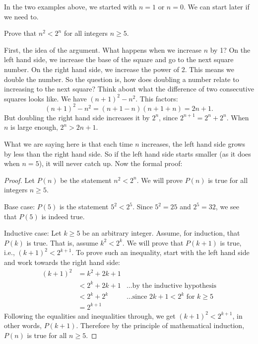 \documentclass[12pt]{article}
\begin{document}
In the two examples above, we started with $n = 1$ or $n = 0$.  We can start later if we need to.

\begin{example}
  Prove that $n^2 < 2^n$ for all integers $n \ge 5$.
  \begin{solution}
  	First, the idea of the argument.  What happens when we increase $n$ by 1?  On the left hand side, we increase the base of the square and go to the next square number.  On the right hand side, we increase the power of 2.  This means we double the number.  So the question is, how does doubling a number relate to increasing to the next square?  Think about what the difference of two consecutive squares looks like.  We have $(n+1)^2 - n^2$.  This factors: \[(n+1)^2 - n^2 = (n+1-n)(n+1+n) = 2n+1.\]
    But doubling the right hand side increases it by $2^n$, since $2^{n+1} = 2^n + 2^n$.  When $n$ is large enough, $2^n > 2n + 1$.  
  	
  	What we are saying here is that each time $n$ increases, the left hand side grows by less than the right hand side.  So if the left hand side starts smaller (as it does when $n = 5$), it will never catch up.  Now the formal proof:
  
  \begin{proof}
    Let $P(n)$ be the statement $n^2 < 2^n$.
    We will prove $P(n)$ is true for all integers $n \ge 5$.
    
    Base case: $P(5)$ is the statement $5^2 < 2^5$.  Since $5^2 = 25$ and $2^5 = 32$, we see that $P(5)$ is indeed true.
    
    Inductive case: Let $k \ge 5$ be an arbitrary integer.  Assume, for induction, that $P(k)$ is true.  That is, assume $k^2 < 2^k$.  We will prove that $P(k+1)$ is true, i.e., $(k+1)^2 < 2^{k+1}$.  To prove such an inequality, start with the left hand side and work towards the right hand side:
    \begin{align*}
      (k+1)^2 & = k^2 + 2k + 1 &\\
       & < 2^k + 2k + 1 &\mbox{\ldots by the inductive hypothesis}\\
       & < 2^k + 2^k  &\mbox{\ldots since $2k + 1 < 2^k$ for $k \ge 5$}\\
       & = 2^{k+1} &
    \end{align*}
    Following the equalities and inequalities through, we get $(k+1)^2 < 2^{k+1}$, in other words, $P(k+1)$.  Therefore by the principle of mathematical induction, $P(n)$ is true for all $n \ge 5$.
  \end{proof}
	\end{solution}
\end{example}
\end{document}
